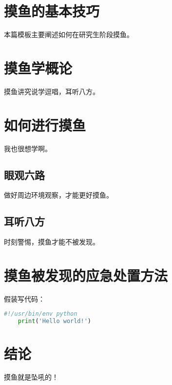\section*{摸鱼的基本技巧}
本篇模板主要阐述如何在研究生阶段摸鱼。


\section{摸鱼学概论}
摸鱼讲究说学逗唱，耳听八方。\cite{park1975entrapment}
    
\section{如何进行摸鱼}
我也很想学啊。

\subsection{眼观六路}
做好周边环境观察，才能更好摸鱼。

\subsection{耳听八方}
时刻警惕，摸鱼才能不被发现。

\section{摸鱼被发现的应急处置方法}

假装写代码：

\begin{lstlisting}[language=python] 
    #!/usr/bin/env python
    print('Hello world!')
\end{lstlisting}


\section{结论}
摸鱼就是坠吼的！
    
    